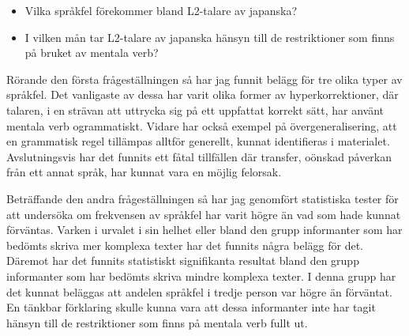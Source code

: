 \documentclass[12pt,a4paper]{article}
\begin{document}
\begin{itemize}
\item Vilka språkfel förekommer bland L2-talare av japanska?
\item I vilken mån tar L2-talare av japanska hänsyn till de restriktioner som finns på bruket av mentala verb?
\end{itemize}

Rörande den första frågeställningen så har jag funnit belägg för tre olika typer av språkfel. Det vanligaste av dessa har varit olika former av hyperkorrektioner, där talaren, i en strävan att uttrycka sig på ett uppfattat korrekt sätt, har använt mentala verb ogrammatiskt. Vidare har också exempel på övergeneralisering, att en grammatisk regel tillämpas alltför generellt, kunnat identifieras i materialet. Avslutningsvis har det funnits ett fåtal tillfällen där transfer, oönskad påverkan från ett annat språk, har kunnat vara en möjlig felorsak.

Beträffande den andra frågeställningen så har jag genomfört statistiska tester för att undersöka om frekvensen av språkfel har varit högre än vad som hade kunnat förväntas. Varken i urvalet i sin helhet eller bland den grupp informanter som har bedömts skriva mer komplexa texter har det funnits några belägg för det. Däremot har det funnits statistiskt signifikanta resultat bland den grupp informanter som har bedömts skriva mindre komplexa texter. I denna grupp har det kunnat beläggas att andelen språkfel i tredje person var högre än förväntat. En tänkbar förklaring skulle kunna vara att dessa informanter inte har tagit hänsyn till de restriktioner som finns på mentala verb fullt ut.




\newpage
\printbibliography[heading=bibintoc,title=Litteratur]
\end{document}
